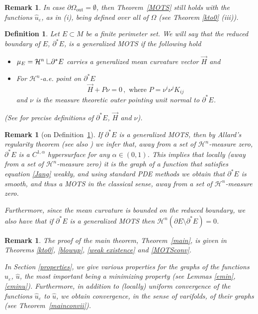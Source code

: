 \documentclass[11pt]{amsart}
\newtheorem{Remark}[Theorem]{Remark}
\newtheorem{Definition}[Theorem]{Definition}
\renewcommand{\epsilon}{\varepsilon}
\def\a{\alpha}
\def\e{\epsilon}
\def\H{\mathcal{H}}
\def\res{\hbox{ {\vrule height .25cm}{\leaders\hrule\hskip.2cm}}\hskip5.0\mu}
\def\out{\text{out}}
\begin{document}
\begin{Remark}
 In case $\partial \Omega_\out=\emptyset$, then Theorem~\ref{MOTS} still holds with the functions $\hat{u}_{\varepsilon}$, as in (i), being defined over all of $\Omega$ (see Theorem \ref{kto0} (iii)).
 \end{Remark}
 \begin{Definition}\label{weakMOTS} Let $E\subset M$ be a finite perimeter set. We will say that the reduced boundary of $E$, $\partial^*E$,  is a generalized MOTS if the following hold 
 \begin{itemize}
 \item $\mu_E=\H^n\res\partial^*E$ carries a generalized mean curvature vector $\vec H$  and
 \item For $\H^n$-a.e. point on $\partial^*E$
 \[\vec H+ P\nu=0\,,\,\,\text{where }P=\nu^i\nu^jK_{ij}\]
 and $\nu$ is the measure theoretic outer pointing unit normal to $\partial^*E$.
  \end{itemize}
 (See  \cite[Definition 16.5 and \S14]{LSgmt} for precise definitions of $\partial^*E$, $\vec H$ and $\nu$).
 \end{Definition}
 \begin{Remark}[on Definition~\ref{weakMOTS}] \label{weakrmk}
 If $\partial^* E$ is a generalized MOTS, then by Allard's regularity theorem \cite{Al} (see also \cite{Alex}) we infer that, away from a set of $\H^n$-measure zero, $\partial^*E$ is a $C^{1,\a}$ hypersurface for any $\a\in (0,1)$. This implies that locally (away from a set of $\H^n$-measure zero) it is the graph of a function that satisfies  equation \eqref{Jang} weakly, and using standard PDE methods we obtain that  $\partial^* E$ is smooth, and thus a MOTS in the classical sense, away from a set of $\H^n$-measure zero.
 
 Furthermore, since the mean curvature is bounded on the reduced boundary, we also have that if  $\partial^* E$ is a generalized MOTS then $\H^n(\partial E\setminus\partial^*E)=0$.
 \end{Remark}
 \begin{Remark}The proof of the main theorem, Theorem~\ref{main}, is given in Theorems \ref{kto0}, \ref{blowup}, \ref{weak existence} and \ref{MOTSconv}. 
 
In Section \ref{properties}, we give various properties for the graphs of the functions $\hat u_\e$, $\hat u$, the most important being a minimizing property (see Lemmas \ref{emin},  \ref{eminu}). Furthermore, in addition to (locally) uniform convergence of the functions $\hat u_\e$ to $\hat u$, we obtain  convergence, in the sense of varifolds, of their graphs (see Theorem~\ref{mainconvii}).  \end{Remark}
\end{document}
